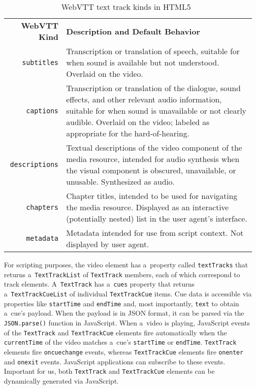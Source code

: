 \documentclass{sig-alternate}
\begin{document}
\begin{table}[b!]\footnotesize
\begin{tabular}{ r p{5.5cm} } %
\textbf{WebVTT Kind} & \textbf{Description and Default Behavior}\\

\texttt{subtitles} & Transcription or translation of speech,
suitable for when sound is available but not understood.
Overlaid on the video.\\

\texttt{captions} & Transcription or translation of the dialogue,
sound effects, and other relevant audio information,
suitable for when sound is unavailable or not clearly audible.
Overlaid on the video;
labeled as appropriate for the hard-of-hearing.\\

\texttt{descriptions} & Textual descriptions of the video component
of the media resource, intended for audio synthesis
when the visual component is obscured, unavailable, or unusable.
Synthesized as audio.\\

\texttt{chapters} & Chapter titles, intended to be used for navigating
the media resource. Displayed as an interactive (potentially nested)
list in the user agent's interface.\\

\texttt{metadata} & Metadata intended for use from script context.
Not displayed by user agent.\\
\end{tabular}
  \caption{WebVTT text track kinds in HTML5~\cite{berjon2013html5}}
  \label{table:texttrackkinds}
\end{table}

For scripting purposes, the video element
has a~property called \texttt{textTracks}
that returns a~\texttt{TextTrackList} of
\texttt{TextTrack} members, each of which correspond
to track elements.
A~\texttt{TextTrack} has a~\texttt{cues} property
that returns a~\texttt{TextTrackCueList} of individual
\texttt{TextTrackCue} items.
Cue data is accessible via properties like
\texttt{startTime} and \texttt{endTime} and,
most importantly, \texttt{text} to obtain a~cue's payload.
When the payload is in JSON format,
it can be parsed via the
\texttt{JSON.parse()} function in JavaScript.
When a~video is playing,
JavaScript events of the \texttt{TextTrack} and \texttt{TextTrackCue}
elements fire automatically when the \texttt{currentTime}
of the video matches
a~cue's \texttt{startTime} or \texttt{endTime}.
\texttt{TextTrack} elements fire \texttt{oncuechange} events,
whereas \texttt{TextTrackCue} elements fire
\texttt{onenter} and \texttt{onexit} events.
JavaScript applications can subscribe to these events.
Important for us, both \texttt{TextTrack} and
\texttt{TextTrackCue} elements
can be dynamically generated via JavaScript.
\end{document}

